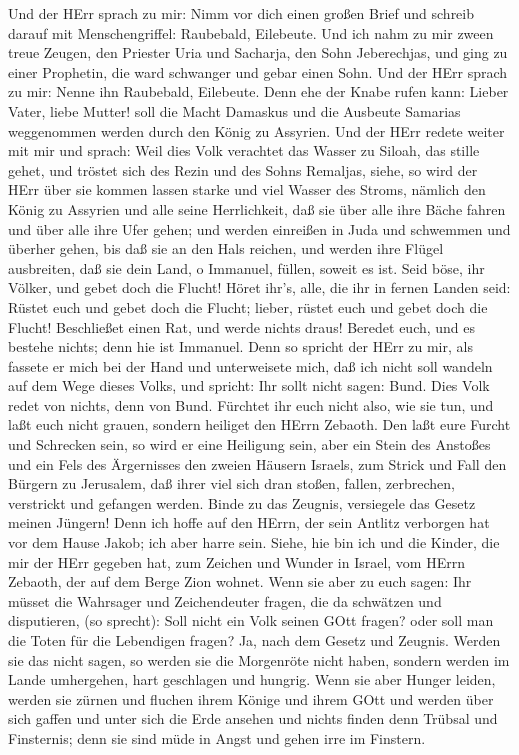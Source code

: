  Und der HErr sprach zu mir: Nimm vor dich einen großen
Brief und schreib darauf mit Menschengriffel: Raubebald, Eilebeute.
 Und ich nahm zu mir zween treue Zeugen, den Priester Uria
und Sacharja, den Sohn Jeberechjas,  und ging zu einer
Prophetin, die ward schwanger und gebar einen Sohn. Und der HErr sprach
zu mir: Nenne ihn Raubebald, Eilebeute.  Denn ehe der Knabe
rufen kann: Lieber Vater, liebe Mutter! soll die Macht Damaskus und die
Ausbeute Samarias weggenommen werden durch den König zu Assyrien.
 Und der HErr redete weiter mit mir und sprach: 
Weil dies Volk verachtet das Wasser zu Siloah, das stille gehet, und
tröstet sich des Rezin und des Sohns Remaljas,  siehe, so
wird der HErr über sie kommen lassen starke und viel Wasser des Stroms,
nämlich den König zu Assyrien und alle seine Herrlichkeit, daß sie über
alle ihre Bäche fahren und über alle ihre Ufer gehen;  und
werden einreißen in Juda und schwemmen und überher gehen, bis daß sie an
den Hals reichen, und werden ihre Flügel ausbreiten, daß sie dein Land,
o Immanuel, füllen, soweit es ist.  Seid böse, ihr Völker,
und gebet doch die Flucht! Höret ihr's, alle, die ihr in fernen Landen
seid: Rüstet euch und gebet doch die Flucht; lieber, rüstet euch und
gebet doch die Flucht!  Beschließet einen Rat, und werde
nichts draus! Beredet euch, und es bestehe nichts; denn hie ist
Immanuel.  Denn so spricht der HErr zu mir, als fassete er
mich bei der Hand und unterweisete mich, daß ich nicht soll wandeln auf
dem Wege dieses Volks, und spricht:  Ihr sollt nicht sagen:
Bund. Dies Volk redet von nichts, denn von Bund. Fürchtet ihr euch nicht
also, wie sie tun, und laßt euch nicht grauen,  sondern
heiliget den HErrn Zebaoth. Den laßt eure Furcht und Schrecken sein,
 so wird er eine Heiligung sein, aber ein Stein des
Anstoßes und ein Fels des Ärgernisses den zweien Häusern Israels, zum
Strick und Fall den Bürgern zu Jerusalem,  daß ihrer viel
sich dran stoßen, fallen, zerbrechen, verstrickt und gefangen werden.
 Binde zu das Zeugnis, versiegele das Gesetz meinen
Jüngern!  Denn ich hoffe auf den HErrn, der sein Antlitz
verborgen hat vor dem Hause Jakob; ich aber harre sein. 
Siehe, hie bin ich und die Kinder, die mir der HErr gegeben hat, zum
Zeichen und Wunder in Israel, vom HErrn Zebaoth, der auf dem Berge Zion
wohnet.  Wenn sie aber zu euch sagen: Ihr müsset die
Wahrsager und Zeichendeuter fragen, die da schwätzen und disputieren,
(so sprecht): Soll nicht ein Volk seinen GOtt fragen? oder soll man die
Toten für die Lebendigen fragen?  Ja, nach dem Gesetz und
Zeugnis. Werden sie das nicht sagen, so werden sie die Morgenröte nicht
haben,  sondern werden im Lande umhergehen, hart geschlagen
und hungrig. Wenn sie aber Hunger leiden, werden sie zürnen und fluchen
ihrem Könige und ihrem GOtt  und werden über sich gaffen
und unter sich die Erde ansehen und nichts finden denn Trübsal und
Finsternis; denn sie sind müde in Angst und gehen irre im Finstern.

